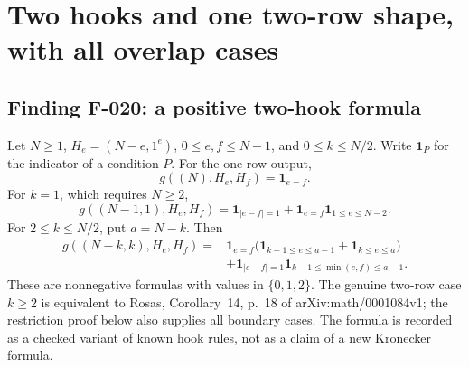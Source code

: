 \section{Two hooks and one two-row shape, with all overlap cases}

\subsection*{Finding F-020: a positive two-hook formula}
Let \(N\geq1\), \(H_e=(N-e,1^e)\),
\(0\leq e,f\leq N-1\), and \(0\leq k\leq N/2\).
Write \(\mathbf1_P\) for the indicator of a condition \(P\).
For the one-row output,
\[
                    g((N),H_e,H_f)=\mathbf1_{e=f}.
\]
For \(k=1\), which requires \(N\geq2\),
\begin{equation}\label{eq:F020hook}
 g((N-1,1),H_e,H_f)=
    \mathbf1_{|e-f|=1}
       +\mathbf1_{e=f}\mathbf1_{1\leq e\leq N-2}.
\end{equation}
For \(2\leq k\leq N/2\), put \(a=N-k\). Then
\begin{equation}\label{eq:F020}
 \begin{split}
 g((N-k,k),H_e,H_f)
   ={}&\mathbf1_{e=f}
       \bigl(\mathbf1_{k-1\leq e\leq a-1}
                    +\mathbf1_{k\leq e\leq a}\bigr)\\
     &+\mathbf1_{|e-f|=1}
                   \mathbf1_{k-1\leq\min(e,f)\leq a-1}.
 \end{split}
\end{equation}
These are nonnegative formulas with values in \(\{0,1,2\}\).
The genuine two-row case \(k\geq2\) is equivalent to
Rosas, Corollary~14, p.~18 of arXiv:math/0001084v1;
the restriction proof below also supplies all boundary cases.
The formula is recorded as a checked variant of known hook
rules, not as a claim of a new Kronecker formula.

